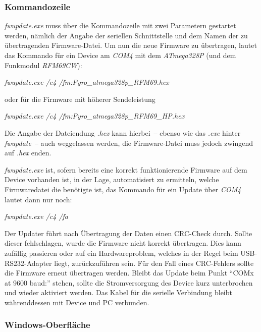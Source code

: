 \documentclass[paper=a4, parskip, numbers=noenddot, toc=listof, headsepline]{scrbook}
\begin{document}
				\subsubsection{Kommandozeile}

					\emph{fwupdate.exe} muss über die Kommandozeile mit zwei Parametern gestartet werden, nämlich der Angabe der seriellen Schnittstelle und dem Namen der zu übertragenden Firmware-Datei. Um nun die neue Firmware zu übertragen, lautet das Kommando für ein Device am \emph{COM4} mit dem \emph{ATmega328P} (und dem Funkmodul \emph{RFM69CW}):

					\begin{center}
						\emph{fwupdate.exe /c4 /fm:Pyro\_atmega328p\_RFM69.hex}
					\end{center}

					oder für die Firmware mit höherer Sendeleistung

					\begin{center}
						\emph{fwupdate.exe /c4 /fm:Pyro\_atmega328p\_RFM69\_HP.hex}
					\end{center}

					Die Angabe der Dateiendung \emph{.hex} kann hierbei~-- ebenso wie das \emph{.exe} hinter \emph{fwupdate}~-- auch weggelassen werden, die Firmware-Datei muss jedoch zwingend auf \emph{.hex} enden.

					\emph{fwupdate.exe} ist, sofern bereits eine korrekt funktionierende Firmware auf dem Device vorhanden ist, in der Lage, automatisiert zu ermitteln, welche Firmwaredatei die benötigte ist, das Kommando für ein Update über \emph{COM4} lautet dann nur noch:

					\begin{center}
						\emph{fwupdate.exe /c4 /fa}
					\end{center}

					Der Updater führt nach Übertragung der Daten einen CRC-Check durch. Sollte dieser fehlschlagen, wurde die Firmware nicht korrekt übertragen. Dies kann zufällig passieren oder auf ein Hardwareproblem, welches in der Regel beim USB-RS232-Adapter liegt, zurückzuführen sein. Für den Fall eines CRC-Fehlers sollte die Firmware erneut übertragen werden. Bleibt das Update beim Punkt \enquote{COMx at 9600 baud:} stehen, sollte die Stromversorgung des Device kurz unterbrochen und wieder aktiviert werden. Das Kabel für die serielle Verbindung bleibt währenddessen mit Device und PC verbunden.

				\subsubsection{Windows-Oberfläche}
\end{document}

